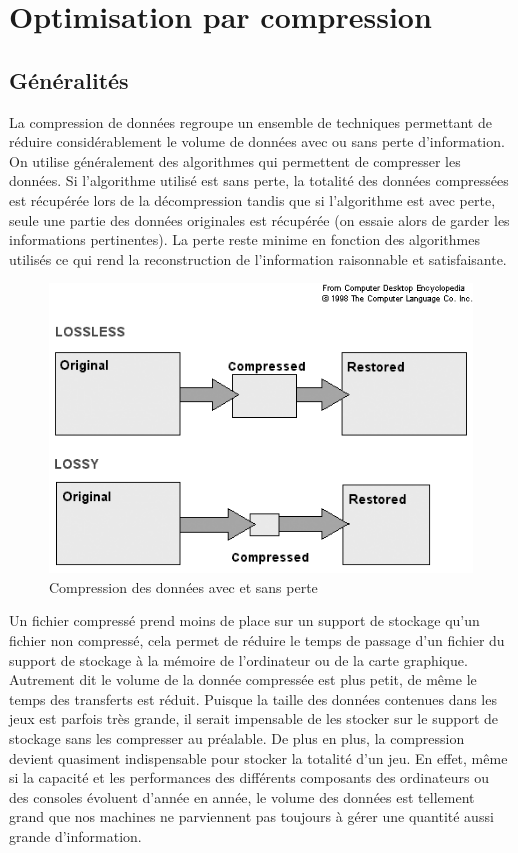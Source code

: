 \documentclass[a4paper, 11pt]{article} %
\begin{document}
\newpage
\section{Optimisation par compression}
\subsection{Généralités}
La compression de données regroupe un ensemble de techniques permettant de réduire considérablement le volume de données avec ou sans perte d'information. On utilise généralement des algorithmes qui permettent de compresser les données. Si l'algorithme utilisé est sans perte, la totalité des données compressées est récupérée lors de la décompression tandis que si l'algorithme est avec perte, seule une partie des données originales est récupérée (on essaie alors de garder les informations pertinentes). La perte reste minime en fonction des algorithmes utilisés ce qui rend la reconstruction de l'information raisonnable et satisfaisante. 

\begin{figure}[!h]%
\includegraphics[width=\columnwidth]{images/data_compression.png}%
\caption{Compression des données avec et sans perte}%
\label{}%
\end{figure}

Un fichier compressé prend moins de place sur un support de stockage qu'un fichier non compressé, cela permet de réduire le temps de passage d'un fichier du support de stockage à la mémoire de l'ordinateur ou de la carte graphique. Autrement dit le volume de la donnée compressée est plus petit, de même le temps des transferts est réduit. Puisque la taille des données contenues dans les jeux est parfois très grande, il serait impensable de les stocker sur le support de stockage sans les compresser au préalable. De plus en plus, la compression devient quasiment indispensable pour stocker la totalité d'un jeu. En effet, même si la capacité et les performances des différents composants des ordinateurs ou des consoles évoluent d'année en année, le volume des données est tellement grand que nos machines ne parviennent pas toujours à gérer une quantité aussi grande d'information.
\end{document}
